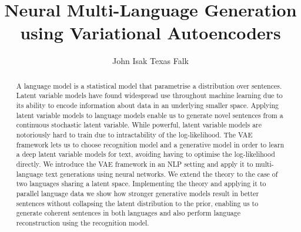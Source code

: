 \makeatletter
\renewcommand {\@degree@string} {Master of Science}
\makeatother

\title{Neural Multi-Language Generation using Variational Autoencoders}
\author{John Isak Texas Falk}

\maketitle

\leavevmode\thispagestyle{empty}\newpage

\begin{abstract}
  A language model is a statistical model that parametrise a distribution over
  sentences. Latent variable models have found widespread use throughout machine learning
  due to its ability to encode information about data in an underlying smaller space. Applying latent
  variable models to language models enable us to generate novel sentences
  from a continuous stochastic latent variable. While powerful, latent variable
  models are notoriously hard to train due to intractability of the
  log-likelihood. The VAE framework lets us to choose recognition model and a
  generative model in order to learn a deep latent variable models for text, avoiding having to optimise the log-likelihood directly. We
  introduce the VAE framework in an NLP setting and apply it to multi-language text generations using neural networks. We extend the theory to the case of
  two languages sharing a latent space. Implementing the theory and applying it to parallel language data we
  show how stronger generative models result in better sentences without
  collapsing the latent distribution to the prior, enabling us to generate coherent sentences in both languages and also perform language reconstruction using
  the recognition model. 
\end{abstract}

\setcounter{tocdepth}{2} 

\tableofcontents
\listoffigures
